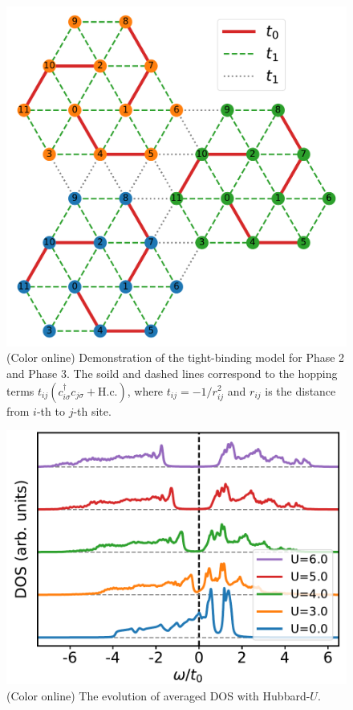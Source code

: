 \documentclass[aps,prb,amsfonts,amsmath,amssymb,showpacs,groupedaddress,superscriptaddress]{revtex4-1}
\begin{document}
\begin{figure}[p]
    \includegraphics[width=\columnwidth]{fig/ModelForPhase2andPhase3.pdf}
    \caption{\label{fig:ModelForPhase2andPhase3} (Color online) Demonstration of the tight-binding model for Phase 2 and Phase 3. The soild and dashed lines correspond to the hopping terms $t_{ij} (c_{i\sigma}^{\dagger} c_{j\sigma} + \text{H.c.})$, where $t_{ij} = -1/r_{ij}^{2}$ and $r_{ij}$ is the distance from $i$-th to $j$-th site.}
\end{figure}

\begin{figure}[p]
    \includegraphics[width=\columnwidth]{fig/CPTForPhase2andPhase3.pdf}
    \caption{\label{fig:CPTForPhase2andPhase3} (Color online) The evolution of averaged DOS with Hubbard-$U$.}
\end{figure}


\end{document}
